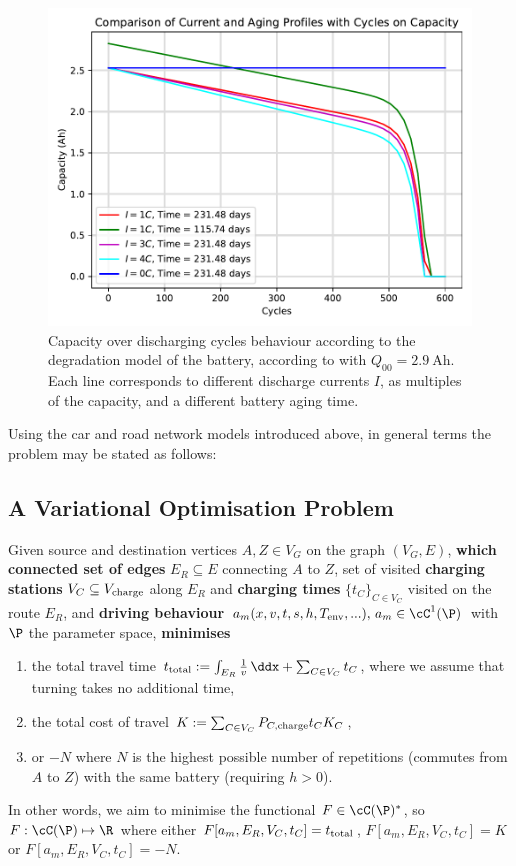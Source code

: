 \documentclass{prettytex/ox/mmsc-special-topic}
\begin{document}
  \begin{figure}[H]
    \centering
    \includegraphics[width=0.7\linewidth]{figures/aging.pdf}
    \caption{Capacity over discharging cycles behaviour according to the degradation model of the battery, according to  with $Q_{00} = \SI{2.9}{\ampere\hour}$. Each line corresponds to different discharge currents $I$, as multiples of the capacity, and a different battery aging time.}
    \label{fig:aging}
  \end{figure}

  Using the car and road network models introduced above, in general terms the problem may be stated as follows:

  \subsection{A Variational Optimisation Problem}
  \label{sec:problem}
  Given source and destination vertices $A, Z \in V_G$ on the graph $(V_G, E)$, \textbf{which connected set of edges} $E_R \subseteq E$ connecting $A$ to $Z$, set of visited \textbf{charging stations} $V_C \subseteq V_{\rm charge}$ along $E_R$ and \textbf{charging times} $\{t_C\}_{C \in V_C}$ visited on the route $E_R$, and \textbf{driving behaviour} $a_m(x, v, t, s, h, T_{\rm env}, ...),\, a_m \in \cC^1(\P)$ with $\P$ the parameter space, \textbf{minimises}
  \begin{enumerate}
    \item the total travel time $t_{\rm total} := \int_{E_R} \frac{1}{v} \,\ddx + \sum_{C \in V_C} t_C$, where we assume that turning takes no additional time,
    \item the total cost of travel $K := \sum_{C \in V_C} P_{C, \rm charge} t_{C} K_C$,
    \item or $-N$ where $N$ is the highest possible number of repetitions (commutes from $A$ to $Z$) with the same battery (requiring $h > 0$). \label{minoption:aging}
  \end{enumerate}
  In other words, we aim to minimise the functional $F \in \cC(\P)^*$, so $F: \cC(\P) \mapsto \R$ where either $F[a_m, E_R, V_C, t_C] = t_{\rm total}$, $F[a_m, E_R, V_C, t_C] = K$ or $F[a_m, E_R, V_C, t_C] = -N$.
\end{document}
